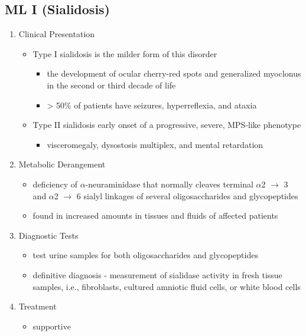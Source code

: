 \documentclass{scrartcl}
\begin{document}
\subsection{ML I (Sialidosis)}
\label{sec:org54b2c6f}
\begin{enumerate}
\item Clinical Presentation
\label{sec:org0f81115}
\begin{itemize}
\item Type I sialidosis is the milder form of this disorder
\begin{itemize}
\item the development of ocular cherry-red spots and generalized
myoclonus in the second or third decade of life
\item \textgreater{} 50\% of patients have seizures, hyperreflexia, and ataxia
\end{itemize}

\item Type II sialidosis early onset of a progressive, severe, MPS-like
phenotype
\begin{itemize}
\item visceromegaly, dysostosis multiplex, and mental retardation
\end{itemize}
\end{itemize}

\item Metabolic Derangement
\label{sec:org03c2bc2}
\begin{itemize}
\item deficiency of \(\alpha\)-neuraminidase that normally cleaves terminal
\(\alpha\)2 \(\to\) 3 and \(\alpha\)2 \(\to\) 6 sialyl linkages of several
oligosaccharides and glycopeptides
\item found in increased amounts in tissues and fluids of affected patients
\end{itemize}

\item Diagnostic Tests
\label{sec:orgab710bf}
\begin{itemize}
\item test urine samples for both oligosaccharides and glycopeptides
\item definitive diagnosis - measurement of sialidase activity in fresh
tissue samples, i.e., fibroblasts, cultured amniotic fluid cells,
or white blood cells
\end{itemize}

\item Treatment
\label{sec:orge43a2b9}
\begin{itemize}
\item supportive
\end{itemize}
\end{enumerate}
\end{document}
